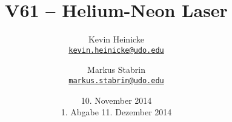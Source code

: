 



\title{%
    V61 -- Helium-Neon Laser
}
\author{%
    Kevin Heinicke\\
    \texttt{\href{mailto:kevin.heinicke@udo.edu}{kevin.heinicke@udo.edu}}
    \and
    Markus Stabrin\\
    \texttt{\href{mailto:markus.stabrin@udo.edu}{markus.stabrin@udo.edu}}
}
\date{%
    10. November 2014\\
    {\small 1. Abgabe} 11. Dezember 2014
}

    \maketitle%
    \tableofcontents
    \newpage

    
    
    
    \printbibliography

